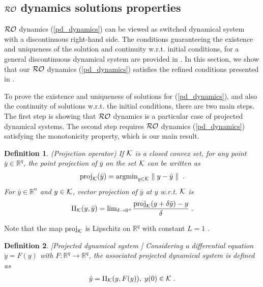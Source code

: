 \documentclass[journal,twoside,web]{ieeecolor}
\newtheorem{definition}{Definition}
\begin{document}
\subsection{${\cal RO}$ dynamics solutions properties}\label{existence.sec}
${\cal RO}$ dynamics (\ref{pd_dynamics}) can be viewed as switched dynamical system with a discontinuous right-hand side. The conditions guaranteeing the existence and uniqueness of the solution and continuity w.r.t. initial conditions, for a general discontinuous dynamical system are provided in \cite[Theorem~2.5]{nagurney2012projected}. In this section, we show that our ${\cal RO}$ dynamics (\ref{pd_dynamics}) satisfies the refined conditions presented in \cite{cherukuri2016}.

To prove the existence and uniqueness of solutions for (\ref{pd_dynamics}), and also the continuity of solutions w.r.t. the initial conditions, there are two main steps. The first step is showing that ${\cal RO}$ dynamics is a particular case of projected dynamical systems. The second step requires ${\cal RO}$ dynamics (\ref{pd_dynamics}) satisfying the monotonicity property, which is our main result.

\begin{definition} \label{projection_operator} (Projection operator)
If ${\cal K}$ is a closed convex set, for any point $\bar y \in \mathbb R^q$, the point projection of $\bar y$ on the set ${\cal K}$ can be written as
\begin{align*}
\text{proj}_{\cal K}(\bar y)=\text{argmin}_{y \in {\cal K}} \parallel y-\bar y \parallel\;.
\end{align*}
For $\bar y \in \mathbb R^n$ and $y \in {\cal K}$, vector projection of $\bar y$ at $y$ w.r.t. ${\cal K}$ is
\begin{align}
\label{projection_operator}
\Pi_{\cal K}(y,\bar y) = \text{lim}_{\delta \rightarrow 0^+} \frac{\text{proj}_{\cal K}(y+\delta \bar y)-y}{\delta}\;.
\end{align}
\end{definition}

Note that the map $\text{proj}_{\cal K}$ is Lipschitz on $\mathbb R^q$ with constant $L=1$ \cite[Proposition~2.4.1]{clarke1983}.

\begin{definition} \label{projected_dynamical_system} [Projected dynamical system \cite{nagurney1996}]
Considering a differential equation $\dot y=F(y)$ with $F:\mathbb R^q \rightarrow \mathbb R^q$, the associated projected dynamical system is defined as
\begin{align}
\label{projected_dynamics}
\dot y = \Pi_{\cal K}(y,F(y)),\; y(0) \in {\cal K}\;.
\end{align}
\end{definition}
\end{document}
